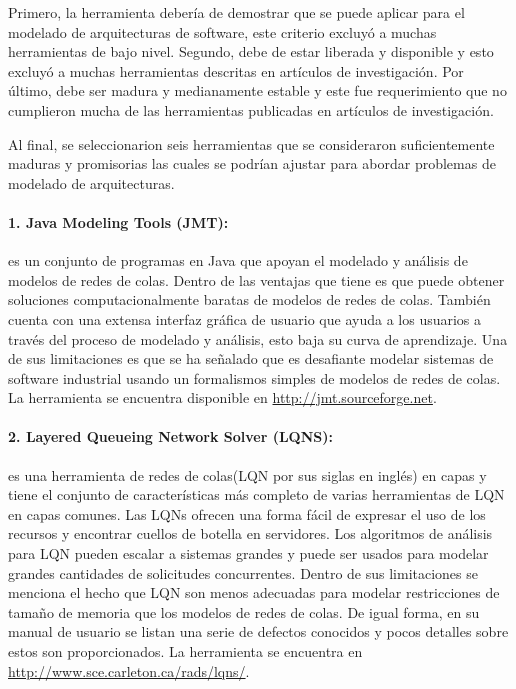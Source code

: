 \documentclass[11pt, twoside]{report}
\begin{document}
Primero, la herramienta debería de demostrar que se puede aplicar para el modelado de arquitecturas de software, este criterio excluyó a muchas herramientas de bajo nivel. Segundo, debe de estar liberada y disponible y esto excluyó a muchas herramientas descritas en artículos de investigación. Por último, debe ser madura y medianamente estable y este fue requerimiento que no cumplieron mucha de las herramientas publicadas en artículos de investigación.

Al final, se seleccionarion seis herramientas que se consideraron suficientemente maduras y promisorias las cuales se podrían ajustar para abordar problemas de modelado de arquitecturas. 

\paragraph{1. Java Modeling Tools (JMT):} es un conjunto de programas en Java que apoyan el modelado y análisis de modelos de redes de colas. Dentro de las ventajas que tiene es que puede obtener soluciones computacionalmente baratas de modelos de redes de colas. También cuenta con una extensa interfaz gráfica de usuario que ayuda a los usuarios a través del proceso de modelado y análisis, esto baja su curva de aprendizaje. Una de sus limitaciones es que se ha señalado que es desafiante modelar sistemas de software industrial usando un formalismos simples de modelos de redes de colas. La herramienta se encuentra disponible en \url{http://jmt.sourceforge.net}.

\paragraph{2. Layered Queueing Network Solver (LQNS):} es una herramienta de redes de colas(LQN por sus siglas en inglés) en capas y tiene el conjunto de características más completo de varias herramientas de LQN en capas comunes. Las LQNs ofrecen una forma fácil de expresar el uso de los recursos y encontrar cuellos de botella en servidores. Los algoritmos de análisis para LQN pueden escalar a sistemas grandes y puede ser usados para modelar grandes cantidades de solicitudes concurrentes. Dentro de sus limitaciones se menciona el hecho que LQN son menos adecuadas para modelar restricciones de tamaño de memoria que los modelos de redes de colas. De igual forma, en su manual de usuario se listan una serie de defectos conocidos y pocos detalles sobre estos son proporcionados. La herramienta se encuentra en \url{http://www.sce.carleton.ca/rads/lqns/}.
\end{document}
